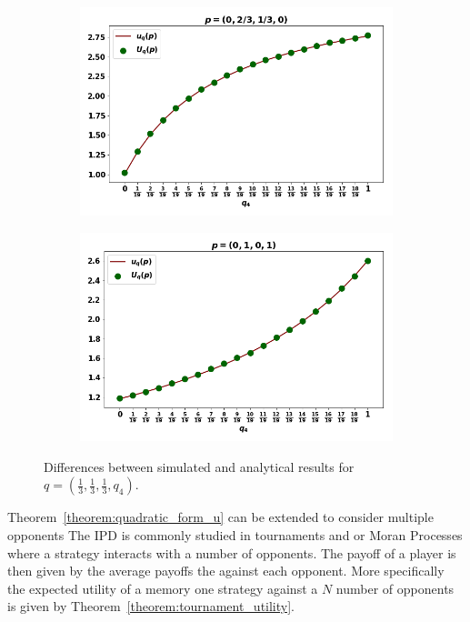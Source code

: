 \documentclass[10pt]{article}
\begin{document}
\begin{figure}[!htbp]
\begin{center}
    \begin{subfigure}{0.45\textwidth}
        \includegraphics[width=\linewidth]{img/validation_img_two.png}
    \end{subfigure}
    \begin{subfigure}{0.45\textwidth}
        \includegraphics[width=\linewidth]{img/validation_img_three.png}
    \end{subfigure}
\end{center}
\caption{Differences between simulated and analytical results for
\(q = (\frac{1}{3}, \frac{1}{3}, \frac{1}{3}, q_4)\).}
\label{fig:analytical_simulated}
\end{figure}

Theorem~\ref{theorem:quadratic_form_u} can be extended to consider multiple
opponents
The IPD is commonly studied in tournaments and or Moran Processes where a
strategy interacts
with a number of opponents. The payoff of a player is then given by the average
payoffs the against each opponent.
More specifically the expected utility of a memory one strategy
against a \(N\) number of opponents is given by Theorem~\ref{theorem:tournament_utility}.
\end{document}
